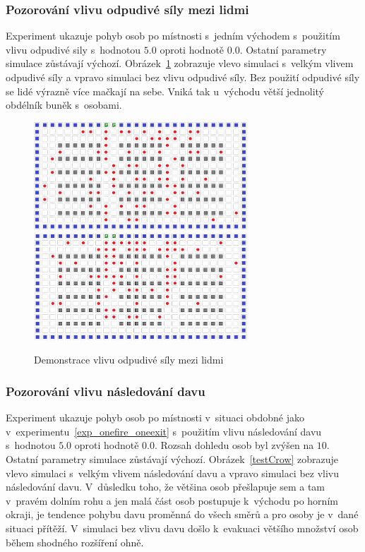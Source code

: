 \documentclass[11pt, titlepage, a4paper]{article}
\begin{document}
        \subsubsection{Pozorování vlivu odpudivé síly mezi lidmi}
        Experiment ukazuje pohyb osob po místnosti s~jedním východem s~použitím vlivu odpudivé sily s~hodnotou $5.0$ oproti hodnotě $0.0$. Ostatní parametry simulace zůstávají výchozí. Obrázek~\ref{testRep} zobrazuje vlevo simulaci s~velkým vlivem odpudivé síly a vpravo simulaci bez vlivu odpudivé síly. Bez použití odpudivé síly se lidé výrazně více mačkají na sebe. Vniká tak u~východu větší jednolitý obdélník buněk s~osobami.\\

        \begin{figure}[H]
            \includegraphics[width=8cm]{TestParams/highRep}
            \includegraphics[width=8cm]{TestParams/noRep}
            \caption{Demonstrace vlivu odpudivé síly mezi lidmi}
            \label{testRep}
        \end{figure}

        \subsubsection{Pozorování vlivu následování davu}
        Experiment ukazuje pohyb osob po místnosti v~situaci obdobné jako v~experimentu~\ref{exp_onefire_oneexit} s~použitím vlivu následování davu s~hodnotou $5.0$ oproti hodnotě $0.0$. Rozsah dohledu osob byl zvýšen na $10$. Ostatní parametry simulace zůstávají výchozí. Obrázek~\ref{testCrow} zobrazuje vlevo simulaci s~velkým vlivem následování davu a vpravo simulaci bez vlivu následování davu. V~důsledku toho, že většina osob přešlapuje sem a tam v~pravém dolním rohu a jen malá část osob postupuje k~východu po horním okraji, je tendence pohybu davu proměnná do všech směrů a pro osoby je v~dané situaci přítěží. V~simulaci bez vlivu davu došlo k~evakuaci většího množství osob během shodného rozšíření ohně.\\
\end{document}
